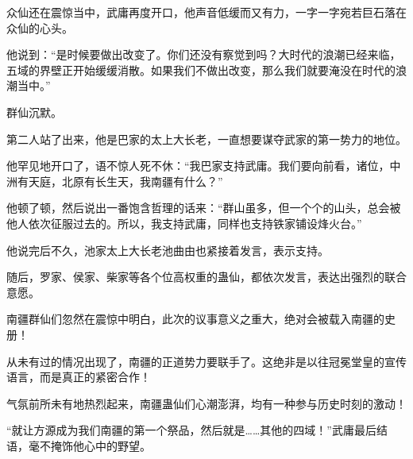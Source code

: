 \begin{this_body}
众仙还在震惊当中，武庸再度开口，他声音低缓而又有力，一字一字宛若巨石落在众仙的心头。

他说到：“是时候要做出改变了。你们还没有察觉到吗？大时代的浪潮已经来临，五域的界壁正开始缓缓消散。如果我们不做出改变，那么我们就要淹没在时代的浪潮当中。”

群仙沉默。

第二人站了出来，他是巴家的太上大长老，一直想要谋夺武家的第一势力的地位。

他罕见地开口了，语不惊人死不休：“我巴家支持武庸。我们要向前看，诸位，中洲有天庭，北原有长生天，我南疆有什么？”

他顿了顿，然后说出一番饱含哲理的话来：“群山虽多，但一个个的山头，总会被他人依次征服过去的。所以，我支持武庸，同样也支持铁家铺设烽火台。”

他说完后不久，池家太上大长老池曲由也紧接着发言，表示支持。

随后，罗家、侯家、柴家等各个位高权重的蛊仙，都依次发言，表达出强烈的联合意愿。

南疆群仙们忽然在震惊中明白，此次的议事意义之重大，绝对会被载入南疆的史册！

从未有过的情况出现了，南疆的正道势力要联手了。这绝非是以往冠冕堂皇的宣传语言，而是真正的紧密合作！

气氛前所未有地热烈起来，南疆蛊仙们心潮澎湃，均有一种参与历史时刻的激动！

“就让方源成为我们南疆的第一个祭品，然后就是……其他的四域！”武庸最后结语，毫不掩饰他心中的野望。

\end{this_body}

